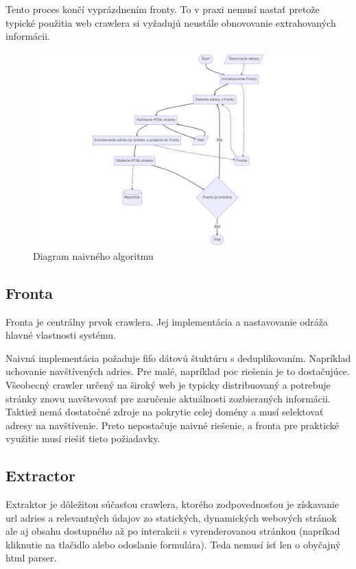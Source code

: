 Tento proces končí vyprázdnením fronty. To v praxi nemusí nastať pretože typické použitia web crawlera si vyžadujú neustále obnovovanie extrahovaných informácii.

\begin{figure}[!ht]
    \centering
    \includegraphics[width=1\textwidth]{figures/basicCrawlAlgorithmMine.png}
    \caption{Diagram naivného algoritmu \label{o:basic_crawl_algorithm} \cite{dataMining}}
\end{figure}

\subsection{Fronta}
Fronta je centrálny prvok crawlera. Jej implementácia a nastavovanie odráža hlavné vlastnosti systému. 

Naivná implementácia požaduje \acrshort{fifo} dátovú štuktúru s deduplikovaním. Napríklad uchovanie navštívených adries. Pre malé, napríklad \acrshort{poc} riešenia je to dostačujúce. 
Všeobecný crawler určený na široký web je typicky distribuovaný a potrebuje stránky znovu navštevovať pre zaručenie aktuálnosti zozbieraných informácii. Taktiež nemá dostatočné zdroje na pokrytie celej domény a musí selektovať adresy na navštívenie. Preto nepostačuje naivné riešenie, a fronta pre praktické využitie musí riešiť tieto požiadavky. 

\subsection{Extractor}
Extraktor je dôležitou súčasťou crawlera, ktorého zodpovednosťou je získavanie \acrshort{url} adries a relevantných údajov zo statických, dynamických webových stránok ale aj obsahu dostupného až po interakcii s vyrenderovanou stránkou (napríkad kliknutie na tlačidlo alebo odoslanie formulára). Teda nemusí ísť len o obyčajný \acrshort{html} parser. 

